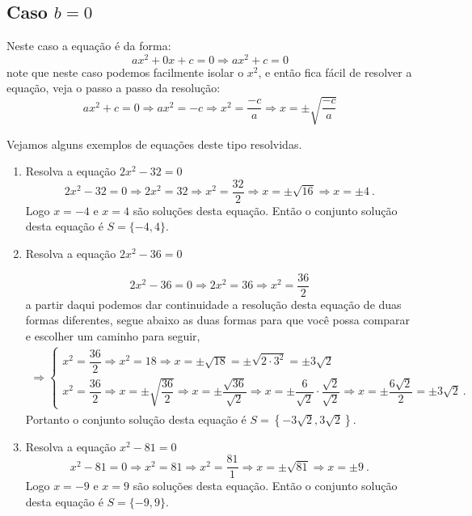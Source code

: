  \subsection{Caso \texorpdfstring{$b=0$}{b=0}}

 Neste caso a equação é da forma:
 \[ax^2 + 0x + c= 0 \Rightarrow ax^2 + c= 0\]
 note que neste caso podemos facilmente isolar o $x^2$, e então fica fácil de resolver a equação, veja o passo a passo da resolução:
 \[ax^2 + c= 0 \Rightarrow ax^2= -c \Rightarrow x^2= \frac{-c}{a} \Rightarrow x= \pm \sqrt{\frac{-c}{a}}\]

 \begin{exem} Vejamos alguns exemplos de equações deste tipo resolvidas.
 \begin{enumerate}[1)]
 \item Resolva a equação $2x^2 - 32=0$
 \[2x^2 - 32=0 \Rightarrow 2x^2= 32 \Rightarrow x^2= \frac{32}{2} \Rightarrow x= \pm \sqrt{16} \Rightarrow x= \pm 4 \ .\]
 Logo $x= -4$ e $x= 4$ são soluções desta equação. Então o conjunto solução desta equação é $S= \{-4, 4\}$.

 \item Resolva a equação $2x^2 - 36=0$

 \[2x^2 - 36=0 \Rightarrow 2x^2= 36 \Rightarrow x^2= \frac{36}{2} \]
 a partir daqui podemos dar continuidade a resolução desta equação de duas formas diferentes, segue abaixo as duas formas para que você possa comparar e escolher um caminho para seguir,
 \begin{eqnarray*}
 \Rightarrow
 \begin{cases}
 x^2= \dfrac{36}{2} \Rightarrow x^2= 18 \Rightarrow x= \pm \sqrt{18}= \pm \sqrt{2 \cdot 3^2}= \pm 3\sqrt{2} \\
 x^2= \dfrac{36}{2} \Rightarrow x= \pm \sqrt{\dfrac{36}{2}} \Rightarrow x= \pm \dfrac{\sqrt{36}}{\sqrt{2}} \Rightarrow x= \pm \dfrac{6}{\sqrt{2}} \cdot \dfrac{\sqrt{2}}{\sqrt{2}} \Rightarrow x= \pm  \dfrac{6\sqrt{2}}{2}= \pm 3\sqrt{2} \ .
 \end{cases}
 \end{eqnarray*}
 Portanto o conjunto solução desta equação é $S= \left\{-3\sqrt{2}, 3\sqrt{2}\right\}$.

  \item Resolva a equação $x^2 - 81=0$
 \[x^2 - 81=0 \Rightarrow x^2= 81 \Rightarrow x^2= \frac{81}{1} \Rightarrow x= \pm \sqrt{81} \Rightarrow x= \pm 9 \ .\]
 Logo $x= -9$ e $x= 9$ são soluções desta equação. Então o conjunto solução desta equação é $S= \{-9, 9\}$.


\end{enumerate}
\end{exem}
